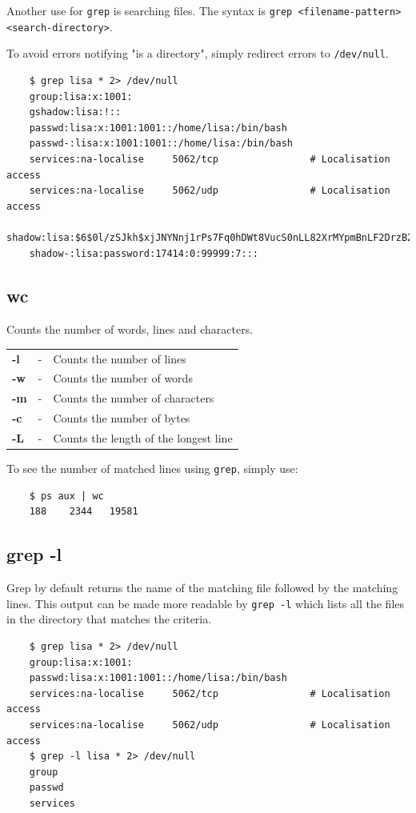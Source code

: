 \documentclass{report}
\begin{document}
	\noindent
	Another use for \verb|grep| is searching files. The syntax is \verb|grep <filename-pattern> <search-directory>|.
	
	To avoid errors notifying "is a directory", simply redirect errors to \verb|/dev/null|.
	
	\begin{verbatim}
	$ grep lisa * 2> /dev/null
	group:lisa:x:1001:
	gshadow:lisa:!::
	passwd:lisa:x:1001:1001::/home/lisa:/bin/bash
	passwd-:lisa:x:1001:1001::/home/lisa:/bin/bash
	services:na-localise     5062/tcp                # Localisation access
	services:na-localise     5062/udp                # Localisation access
	shadow:lisa:$6$0l/zSJkh$xjJNYNnj1rPs7Fq0hDWt8VucS0nLL82XrMYpmBnLF2DrzB2npFvCwxM9MJEHgCHCwvabCgEA17LK2aU0h9FIT/:17414:0:99999:7:::
	shadow-:lisa:password:17414:0:99999:7:::
	\end{verbatim}
	
	\subsection{wc}
	Counts the number of words, lines and characters. 
	
	\begin{tabular}{lcl}
		\textbf{-l} &- &Counts the number of lines \\
		\textbf{-w} &- &Counts the number of words \\
		\textbf{-m} &- &Counts the number of characters \\
		\textbf{-c} &- &Counts the number of bytes \\
		\textbf{-L} &- &Counts the length of the longest line \\
	\end{tabular}

	To see the number of matched lines using \verb|grep|, simply use:
	
	\begin{verbatim}
	$ ps aux | wc
	188    2344   19581
	\end{verbatim}

	\subsection{grep -l}
	Grep by default returns the name of the matching file followed by the matching lines. This output can be made more readable by \verb|grep -l| which lists all the files in the directory that matches the criteria.
	
	\begin{verbatim}
	$ grep lisa * 2> /dev/null
	group:lisa:x:1001:
	passwd:lisa:x:1001:1001::/home/lisa:/bin/bash
	services:na-localise     5062/tcp                # Localisation access
	services:na-localise     5062/udp                # Localisation access
	$ grep -l lisa * 2> /dev/null
	group
	passwd
	services
	\end{verbatim}
	
\end{document}
